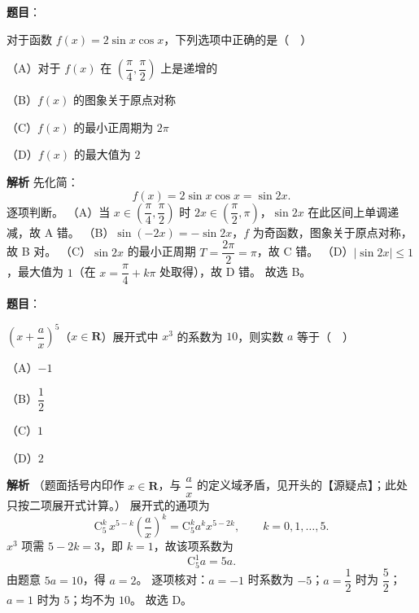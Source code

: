 \begin{answer}

\textbf{题目}：

对于函数 $f(x)=2\sin x\cos x$，下列选项中正确的是（　）

（A）对于 $f(x)$ 在 $\left(\dfrac{\pi}{4},\dfrac{\pi}{2}\right)$ 上是递增的

（B）$f(x)$ 的图象关于原点对称

（C）$f(x)$ 的最小正周期为 $2\pi$

（D）$f(x)$ 的最大值为 $2$

\textbf{解析}
先化简：
\nopagebreak[4]
\[f(x)=2\sin x\cos x=\sin 2x.\]
逐项判断。
（A）当 $x\in\left(\dfrac{\pi}{4},\dfrac{\pi}{2}\right)$ 时 $2x\in\left(\dfrac{\pi}{2},\pi\right)$，$\sin 2x$ 在此区间上单调递减，故 A 错。
（B）$\sin(-2x)=-\sin 2x$，$f$ 为奇函数，图象关于原点对称，故 B 对。
（C）$\sin 2x$ 的最小正周期 $T=\dfrac{2\pi}{2}=\pi$，故 C 错。
（D）$|\sin 2x|\leqslant 1$，最大值为 $1$（在 $x=\dfrac{\pi}{4}+k\pi$ 处取得），故 D 错。
故选 B。


\end{answer}
\begin{answer}

\textbf{题目}：

$\left(x+\dfrac{a}{x}\right)^5$（$x\in\mathbf R$）展开式中 $x^3$ 的系数为 $10$，则实数 $a$ 等于（　）

（A）$-1$

（B）$\dfrac12$

（C）$1$

（D）$2$

\textbf{解析}
（题面括号内印作 $x\in\mathbf R$，与 $\dfrac ax$ 的定义域矛盾，见开头的【源疑点】；此处只按二项展开式计算。）
展开式的通项为
\nopagebreak[4]
\[\mathrm C_5^k\,x^{5-k}\left(\frac ax\right)^k=\mathrm C_5^k a^k x^{5-2k},\qquad k=0,1,\dots,5.\]
$x^3$ 项需 $5-2k=3$，即 $k=1$，故该项系数为
\nopagebreak[4]
\[\mathrm C_5^1 a=5a.\]
由题意 $5a=10$，得 $a=2$。
逐项核对：$a=-1$ 时系数为 $-5$；$a=\dfrac12$ 时为 $\dfrac52$；$a=1$ 时为 $5$；均不为 $10$。
故选 D。


\end{answer}
